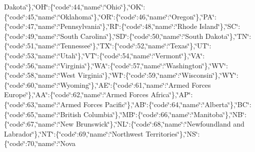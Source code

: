\begin{DoxyCompactItemize}
Dakota\char`\"{}\},\char`\"{}O\-H\char`\"{}\-:\{\char`\"{}code\char`\"{}\-:44,\char`\"{}name\char`\"{}\-:\char`\"{}Ohio\char`\"{}\},\char`\"{}O\-K\char`\"{}\-:\{\char`\"{}code\char`\"{}\-:45,\char`\"{}name\char`\"{}\-:\char`\"{}Oklahoma\char`\"{}\},\char`\"{}O\-R\char`\"{}\-:\{\char`\"{}code\char`\"{}\-:46,\char`\"{}name\char`\"{}\-:\char`\"{}Oregon\char`\"{}\},\char`\"{}P\-A\char`\"{}\-:\{\char`\"{}code\char`\"{}\-:47,\char`\"{}name\char`\"{}\-:\char`\"{}Pennsylvania\char`\"{}\},\char`\"{}R\-I\char`\"{}\-:\{\char`\"{}code\char`\"{}\-:48,\char`\"{}name\char`\"{}\-:\char`\"{}Rhode Island\char`\"{}\},\char`\"{}S\-C\char`\"{}\-:\{\char`\"{}code\char`\"{}\-:49,\char`\"{}name\char`\"{}\-:\char`\"{}South Carolina\char`\"{}\},\char`\"{}S\-D\char`\"{}\-:\{\char`\"{}code\char`\"{}\-:50,\char`\"{}name\char`\"{}\-:\char`\"{}South Dakota\char`\"{}\},\char`\"{}T\-N\char`\"{}\-:\{\char`\"{}code\char`\"{}\-:51,\char`\"{}name\char`\"{}\-:\char`\"{}Tennessee\char`\"{}\},\char`\"{}T\-X\char`\"{}\-:\{\char`\"{}code\char`\"{}\-:52,\char`\"{}name\char`\"{}\-:\char`\"{}Texas\char`\"{}\},\char`\"{}U\-T\char`\"{}\-:\{\char`\"{}code\char`\"{}\-:53,\char`\"{}name\char`\"{}\-:\char`\"{}Utah\char`\"{}\},\char`\"{}V\-T\char`\"{}\-:\{\char`\"{}code\char`\"{}\-:54,\char`\"{}name\char`\"{}\-:\char`\"{}Vermont\char`\"{}\},\char`\"{}V\-A\char`\"{}\-:\{\char`\"{}code\char`\"{}\-:56,\char`\"{}name\char`\"{}\-:\char`\"{}Virginia\char`\"{}\},\char`\"{}W\-A\char`\"{}\-:\{\char`\"{}code\char`\"{}\-:57,\char`\"{}name\char`\"{}\-:\char`\"{}Washington\char`\"{}\},\char`\"{}W\-V\char`\"{}\-:\{\char`\"{}code\char`\"{}\-:58,\char`\"{}name\char`\"{}\-:\char`\"{}West Virginia\char`\"{}\},\char`\"{}W\-I\char`\"{}\-:\{\char`\"{}code\char`\"{}\-:59,\char`\"{}name\char`\"{}\-:\char`\"{}Wisconsin\char`\"{}\},\char`\"{}W\-Y\char`\"{}\-:\{\char`\"{}code\char`\"{}\-:60,\char`\"{}name\char`\"{}\-:\char`\"{}Wyoming\char`\"{}\},\char`\"{}A\-E\char`\"{}\-:\{\char`\"{}code\char`\"{}\-:61,\char`\"{}name\char`\"{}\-:\char`\"{}Armed Forces Europe\char`\"{}\},\char`\"{}A\-A\char`\"{}\-:\{\char`\"{}code\char`\"{}\-:62,\char`\"{}name\char`\"{}\-:\char`\"{}Armed Forces Africa\char`\"{}\},\char`\"{}A\-P\char`\"{}\-:\{\char`\"{}code\char`\"{}\-:63,\char`\"{}name\char`\"{}\-:\char`\"{}Armed Forces Pacific\char`\"{}\},\char`\"{}A\-B\char`\"{}\-:\{\char`\"{}code\char`\"{}\-:64,\char`\"{}name\char`\"{}\-:\char`\"{}Alberta\char`\"{}\},\char`\"{}B\-C\char`\"{}\-:\{\char`\"{}code\char`\"{}\-:65,\char`\"{}name\char`\"{}\-:\char`\"{}British Columbia\char`\"{}\},\char`\"{}M\-B\char`\"{}\-:\{\char`\"{}code\char`\"{}\-:66,\char`\"{}name\char`\"{}\-:\char`\"{}Manitoba\char`\"{}\},\char`\"{}N\-B\char`\"{}\-:\{\char`\"{}code\char`\"{}\-:67,\char`\"{}name\char`\"{}\-:\char`\"{}New Brunswick\char`\"{}\},\char`\"{}N\-L\char`\"{}\-:\{\char`\"{}code\char`\"{}\-:68,\char`\"{}name\char`\"{}\-:\char`\"{}Newfoundland and Labrador\char`\"{}\},\char`\"{}N\-T\char`\"{}\-:\{\char`\"{}code\char`\"{}\-:69,\char`\"{}name\char`\"{}\-:\char`\"{}Northwest Territories\char`\"{}\},\char`\"{}N\-S\char`\"{}\-:\{\char`\"{}code\char`\"{}\-:70,\char`\"{}name\char`\"{}\-:\char`\"{}Nova 
\end{DoxyCompactItemize}
